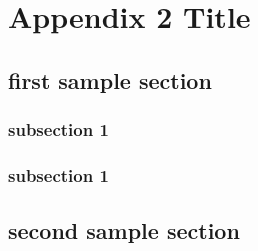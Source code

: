 \chapter{Appendix 2 Title}

\blindtext

\section{first sample section}

\subsection{subsection 1}

\blindtext

\subsection{subsection 1}

\blindtext

\section{second sample section}

\blindtext
